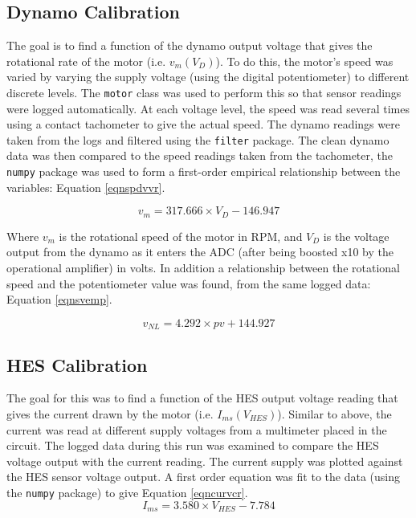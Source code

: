 \documentclass[twoside,a4]{report}
\begin{document}
	\subsection*{Dynamo Calibration}
	The goal is to find a function of the dynamo output voltage that gives the rotational rate of the motor (i.e. \(v_m ({V_D})\)). To do this, the motor's speed was varied by varying the supply voltage (using the digital potentiometer) to different discrete levels. The \texttt{motor} class was used to perform this so that sensor readings were logged automatically. At each voltage level, the speed was read several times using a contact tachometer to give the actual speed. The dynamo readings were taken from the logs and filtered using the \texttt{filter} package. The clean dynamo data was then compared to the speed readings taken from the tachometer, the \texttt{numpy} package was used to form a first-order empirical relationship between the variables: Equation \ref{eqnspdvvr}.
	
	\begin{equation}
		v_m = 317.666 \times {V_D} - 146.947
		\label{eqnspdvvr}
	\end{equation}
	
	
	\noindent
	Where \(v_m\) is the rotational speed of the motor in RPM, and \(V_D\) is the voltage output from the dynamo as it enters the ADC (after being boosted x10 by the operational amplifier) in volts. In addition a relationship between the rotational speed and the potentiometer value was found, from the same logged data: Equation \ref{eqnsvemp}.
	
	\begin{equation}
		v_{NL} = 4.292 \times pv + 144.927
		\label{eqnsvemp}
	\end{equation}
	
	
	\subsection*{HES Calibration}
	The goal for this was to find a function of the HES output voltage reading that gives the current drawn by the motor (i.e. \(I_{ms} ({V_{HES}})\)). Similar to above, the current was read at different supply voltages from a multimeter placed in the circuit. The logged data during this run was examined to compare the HES voltage output with the current reading. The current supply was plotted against the HES sensor voltage output. A first order equation was fit to the data (using the \texttt{numpy} package) to give Equation \ref{eqncurvcr}.
	\begin{equation}
		I_{ms} = 3.580 \times {V_{HES}} - 7.784
		\label{eqncurvcr}
	\end{equation}
	
\end{document}
